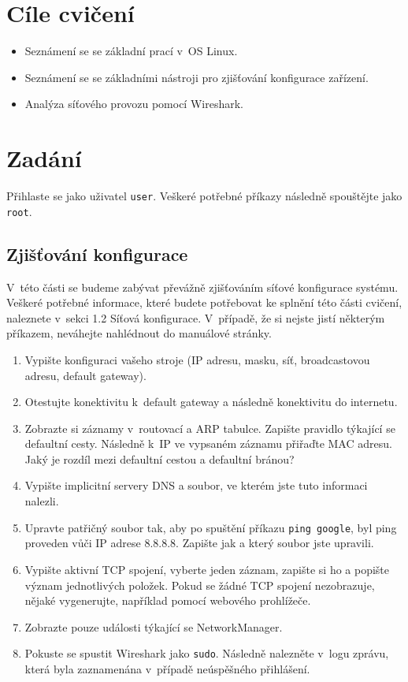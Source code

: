 \section{Cíle cvičení}
\begin{itemize}
	\item Seznámení se se základní prací v~OS Linux.
	\item Seznámení se se základními nástroji pro zjišťování konfigurace zařízení.
	\item Analýza síťového provozu pomocí Wireshark.
\end{itemize}

\section{Zadání}
Přihlaste se jako uživatel \texttt{user}. Veškeré potřebné příkazy následně spouštějte jako \texttt{root}.

\subsection{Zjišťování konfigurace}
V~této části se budeme zabývat převážně zjišťováním síťové konfigurace systému. Veškeré potřebné informace, které budete potřebovat ke splnění této části cvičení, naleznete v~sekci 1.2 Síťová konfigurace. V~případě, že si nejste jistí některým příkazem, neváhejte nahlédnout do manuálové stránky.

\begin{enumerate}
\item Vypište konfiguraci vašeho stroje (IP adresu, masku, síť, broadcastovou adresu, default gateway).
\item Otestujte konektivitu k~default gateway a následně konektivitu do internetu.
\item Zobrazte si záznamy v~routovací a ARP tabulce. Zapište pravidlo týkající se defaultní cesty. Následně k~IP ve vypsaném záznamu přiřaďte MAC adresu. Jaký je rozdíl mezi defaultní cestou a defaultní bránou?
\item Vypište implicitní servery DNS a soubor, ve kterém jste tuto informaci nalezli.
\item Upravte patřičný soubor tak, aby po spuštění příkazu \texttt{ping google}, byl ping proveden vůči IP adrese 8.8.8.8. Zapište jak a který soubor jste upravili.
\item Vypište aktivní TCP spojení, vyberte jeden záznam, zapište si ho a popište význam jednotlivých položek. Pokud se žádné TCP spojení nezobrazuje, nějaké vygenerujte, například pomocí webového prohlížeče.
\item Zobrazte pouze události týkající se NetworkManager.
\item Pokuste se spustit Wireshark jako \texttt{sudo}. Následně nalezněte v~logu zprávu, která byla zaznamenána v~případě neúspěšného přihlášení.
\end{enumerate}

